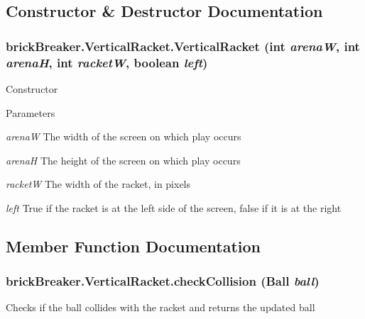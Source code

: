 \subsection{Constructor \& Destructor Documentation}
\hypertarget{classbrick_breaker_1_1_vertical_racket_a2131363067760b416b9a857cba22c8ae}{
\subsubsection[{VerticalRacket}]{\setlength{\rightskip}{0pt plus 5cm}brickBreaker.VerticalRacket.VerticalRacket (int {\em arenaW}, \/  int {\em arenaH}, \/  int {\em racketW}, \/  boolean {\em left})}}
\label{classbrick_breaker_1_1_vertical_racket_a2131363067760b416b9a857cba22c8ae}
Constructor


\begin{DoxyParams}{Parameters}
\item[{\em arenaW}]The width of the screen on which play occurs \item[{\em arenaH}]The height of the screen on which play occurs \item[{\em racketW}]The width of the racket, in pixels \item[{\em left}]True if the racket is at the left side of the screen, false if it is at the right \end{DoxyParams}


\subsection{Member Function Documentation}
\hypertarget{classbrick_breaker_1_1_vertical_racket_a8893265e40d1d8946702d26f8c07887b}{
\subsubsection[{checkCollision}]{ brickBreaker.VerticalRacket.checkCollision ({\bf Ball} {\em ball})}}
\label{classbrick_breaker_1_1_vertical_racket_a8893265e40d1d8946702d26f8c07887b}
Checks if the ball collides with the racket and returns the updated ball


